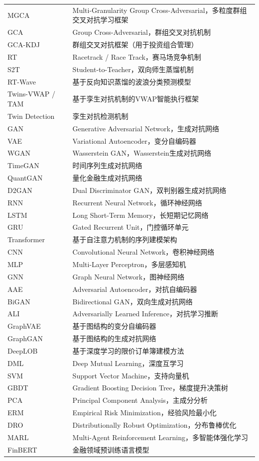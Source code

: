 \begin{longtable}{>{\raggedright\arraybackslash}p{4cm} p{10cm}}
MGCA & Multi-Granularity Group Cross-Adversarial，多粒度群组交叉对抗学习框架 \\
GCA & Group Cross-Adversarial，群组交叉对抗机制 \\
GCA-KDJ & 群组交叉对抗框架（用于投资组合管理） \\
RT & Racetrack / Race Track，赛马场竞争机制 \\
S2T & Student-to-Teacher，双向师生蒸馏机制 \\
RT-Wave & 基于反向知识蒸馏的波浪分类预测模型 \\
Twins-VWAP / TAM & 基于孪生对抗机制的VWAP智能执行框架 \\
Twin Detection & 孪生对抗检测机制 \\
GAN & Generative Adversarial Network，生成对抗网络 \\
VAE & Variational Autoencoder，变分自编码器 \\
WGAN & Wasserstein GAN，Wasserstein生成对抗网络 \\
TimeGAN & 时间序列生成对抗网络 \\
QuantGAN & 量化金融生成对抗网络 \\
D2GAN & Dual Discriminator GAN，双判别器生成对抗网络 \\
RNN & Recurrent Neural Network，循环神经网络 \\
LSTM & Long Short-Term Memory，长短期记忆网络 \\
GRU & Gated Recurrent Unit，门控循环单元 \\
Transformer & 基于自注意力机制的序列建模架构 \\
CNN & Convolutional Neural Network，卷积神经网络 \\
MLP & Multi-Layer Perceptron，多层感知机 \\
GNN & Graph Neural Network，图神经网络 \\
AAE & Adversarial Autoencoder，对抗自编码器 \\
BiGAN & Bidirectional GAN，双向生成对抗网络 \\
ALI & Adversarially Learned Inference，对抗学习推断 \\
GraphVAE & 基于图结构的变分自编码器 \\
GraphGAN & 基于图结构的生成对抗网络 \\
DeepLOB & 基于深度学习的限价订单簿建模方法 \\
DML & Deep Mutual Learning，深度互学习 \\
SVM & Support Vector Machine，支持向量机 \\
GBDT & Gradient Boosting Decision Tree，梯度提升决策树 \\
PCA & Principal Component Analysis，主成分分析 \\
ERM & Empirical Risk Minimization，经验风险最小化 \\
DRO & Distributionally Robust Optimization，分布鲁棒优化 \\
MARL & Multi-Agent Reinforcement Learning，多智能体强化学习 \\
FinBERT & 金融领域预训练语言模型 \\
\end{longtable}

